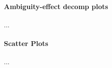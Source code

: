 \documentclass[../main.tex]{subfiles}
\begin{document}










\paragraph{Ambiguity-effect decomp plots} ...

\paragraph{Scatter Plots} ...
\end{document}
